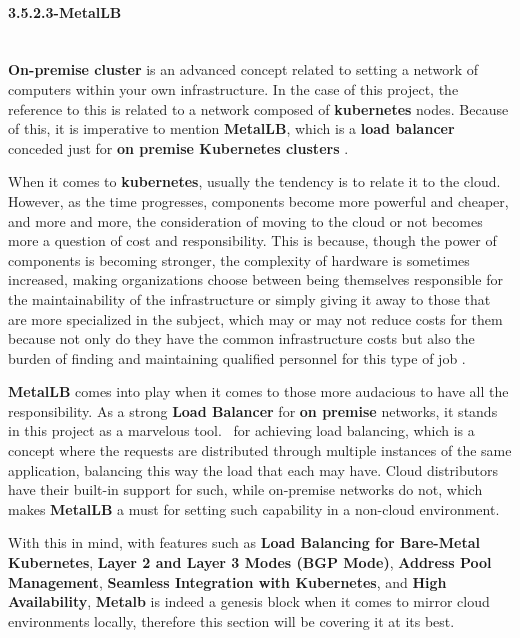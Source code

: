 \paragraph{3.5.2.3-MetalLB}\mbox{}\\
\textbf{On-premise cluster} is an advanced concept related to setting a network of computers within your own infrastructure. In the case of this project, the reference to this is related to a network composed of \textbf{kubernetes} nodes. Because of this, it is imperative to mention \textbf{MetalLB}, which is a \textbf{load balancer} conceded just for \textbf{on premise Kubernetes clusters} \cite{lb}.

When it comes to \textbf{kubernetes}, usually the tendency is to relate it to the cloud. However, as the time progresses, components become more powerful and cheaper, and more and more, the consideration of moving to the cloud or not becomes more a question of cost and responsibility. This is because, though the power of components is becoming stronger, the complexity of hardware is sometimes increased, making organizations choose between being themselves responsible for the maintainability of the infrastructure or simply giving it away to those that are more specialized in the subject, which may or may not reduce costs for them because not only do they have the common infrastructure costs but also the burden of finding and maintaining qualified personnel for this type of job \cite{onpremice-cloud}.

\textbf{MetalLB} comes into play when it comes to those more audacious to have all the responsibility. As a strong \textbf{Load Balancer} for \textbf{on premise} networks, it stands in this project as a marvelous tool. 
for achieving load balancing, which is a concept where the requests are distributed through multiple instances of the same application, balancing this way the load that each may have. Cloud distributors have their built-in support for such, while on-premise networks do not, which makes \textbf{MetalLB} a must for setting such capability in a non-cloud environment.

With this in mind, with features such as \textbf{Load Balancing for Bare-Metal Kubernetes}, \textbf{Layer 2 and Layer 3 Modes (BGP Mode)}, \textbf{Address Pool Management}, \textbf{Seamless Integration with Kubernetes}, and \textbf{High Availability}, \textbf{Metalb} is indeed a genesis block when it comes to mirror cloud environments locally, therefore this section will be covering it at its best.

